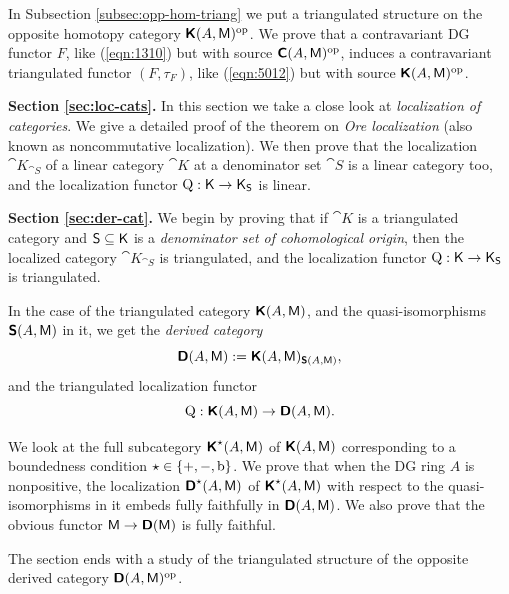 In Subsection \ref{subsec:opp-hom-triang} we put a triangulated structure on 
the opposite homotopy category 
$\boldsymbol{\mathsf{K}}(A, \operatorname{\mathsf{M}})^{\mathrm{op}}$.
We prove that a contravariant DG functor $F$, like (\ref{eqn:1310}) but
with source $\boldsymbol{\mathsf{C}}(A, \operatorname{\mathsf{M}})^{\mathrm{op}}$, induces a 
contravariant triangulated functor $(F, \tau_F)$, like (\ref{eqn:5012}) but
with source $\boldsymbol{\mathsf{K}}(A, \operatorname{\mathsf{M}})^{\mathrm{op}}$.



\medskip \noindent 
{\bf Section \ref{sec:loc-cats}.}
In this section we take a close look at {\em localization of categories}. 
We give a detailed proof of the theorem on {\em Ore localization} (also known 
as noncommutative localization). We then prove that the localization 
$\cat{K}_{\cat{S}}$ of a linear category $\cat{K}$ at a denominator set 
$\cat{S}$ is a linear category too, and the localization functor 
$\operatorname{Q} : \operatorname{\mathsf{K}} \to \operatorname{\mathsf{K}}_{\operatorname{\mathsf{S}}}$ is linear. 


\medskip \noindent 
{\bf Section \ref{sec:der-cat}.}
We begin by proving that if $\cat{K}$ is a triangulated category and 
$\operatorname{\mathsf{S}} \subseteq \operatorname{\mathsf{K}}$ is a {\em denominator set of cohomological origin}, then 
the localized category $\cat{K}_{\cat{S}}$ is triangulated, 
and the localization functor 
$\operatorname{Q} : \operatorname{\mathsf{K}} \to \operatorname{\mathsf{K}}_{\operatorname{\mathsf{S}}}$ is triangulated.

In the case of the triangulated category $\boldsymbol{\mathsf{K}}(A, \operatorname{\mathsf{M}})$, and the 
quasi-iso\-morph\-isms $\boldsymbol{\mathsf{S}}(A, \operatorname{\mathsf{M}})$ in it, we get the {\em derived 
category}
\begin{equation} \label{eqn:5013}
\boldsymbol{\mathsf{D}}(A, \operatorname{\mathsf{M}}) := \boldsymbol{\mathsf{K}}(A, \operatorname{\mathsf{M}})_{\boldsymbol{\mathsf{S}}(A, \operatorname{\mathsf{M}})} ,
\end{equation}
and the triangulated localization functor 
\begin{equation} \label{eqn:5014}
\operatorname{Q} : \boldsymbol{\mathsf{K}}(A, \operatorname{\mathsf{M}}) \to \boldsymbol{\mathsf{D}}(A, \operatorname{\mathsf{M}}) . 
\end{equation}

We look at the full subcategory $\boldsymbol{\mathsf{K}}^{\star}(A, \operatorname{\mathsf{M}})$
of $\boldsymbol{\mathsf{K}}(A, \operatorname{\mathsf{M}})$ corresponding to a boundedness condition 
$\star \in \{ +, -, \mathrm{b} \}$. 
We prove that when the DG ring $A$ is nonpositive, the localization
$\boldsymbol{\mathsf{D}}^{\star}(A, \operatorname{\mathsf{M}})$ of $\boldsymbol{\mathsf{K}}^{\star}(A, \operatorname{\mathsf{M}})$
with respect to the quasi-iso\-morphisms in it embeds
fully faithfully in $\boldsymbol{\mathsf{D}}(A, \operatorname{\mathsf{M}})$. 
We also prove that the obvious functor 
$\operatorname{\mathsf{M}} \to \boldsymbol{\mathsf{D}}(\operatorname{\mathsf{M}})$ is fully faithful.

The section ends with a study of the triangulated structure of the opposite 
derived category $\boldsymbol{\mathsf{D}}(A, \operatorname{\mathsf{M}})^{\mathrm{op}}$.

